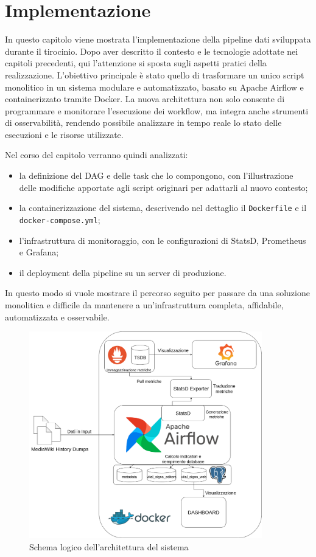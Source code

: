 \chapter{Implementazione}
\label{cha:implementazione}

In questo capitolo viene mostrata l'implementazione della pipeline dati sviluppata durante
il tirocinio. Dopo aver descritto il contesto e le tecnologie adottate nei capitoli precedenti, qui l’attenzione si sposta sugli aspetti pratici della realizzazione.
L’obiettivo principale è stato quello di trasformare un unico script monolitico in un sistema modulare e automatizzato, basato su Apache Airflow e containerizzato tramite Docker. La nuova architettura non solo consente di programmare e monitorare l’esecuzione dei workflow, ma integra anche strumenti di osservabilità, rendendo possibile analizzare in tempo reale lo stato delle esecuzioni e le risorse utilizzate.

Nel corso del capitolo verranno quindi analizzati:


\begin{itemize}
    \item la definizione del DAG e delle task che lo compongono, con l’illustrazione delle modifiche apportate agli script originari per adattarli al nuovo contesto;
    \item la containerizzazione del sistema, descrivendo nel dettaglio il \texttt{Dockerfile} e il \texttt{docker-compose.yml};
    \item l’infrastruttura di monitoraggio, con le configurazioni di StatsD, Prometheus e Grafana;
    \item il deployment della pipeline su un server di produzione.
\end{itemize}

In questo modo si vuole mostrare il percorso seguito per passare da una soluzione monolitica e difficile da mantenere a un’infrastruttura completa, affidabile, automatizzata e osservabile.

\begin{figure}[ht]
    \centering
    \includegraphics[width=0.9\textwidth]{img/vital-signs-pipeline.drawio.png}
    \caption{Schema logico dell'architettura del sistema}
    \label{fig:architettura_sistema}
\end{figure}

